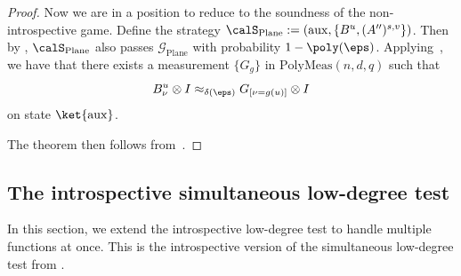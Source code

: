 \documentclass[11pt]{article}
\newcommand{\polymeas}[3]{\mathrm{PolyMeas}(#1,#2,#3)}
\newcommand{\game}{\mathscr{G}}
\begin{document}
\begin{proof}
Now we are in a position to reduce to the soundness of the non-introspective game. Define the strategy $\calS_{\mathrm{Plane}} := (\mathrm{aux}, \{B^u, (A'')^{s, v}\})$.
Then by , $\calS_{\mathrm{Plane}}$ also passes $\game_{\mathrm{Plane}}$ with probability $1-\poly(\eps)$.
Applying~, we have that
there exists a measurement $\{G_g\}$ in $\polymeas{n}{d}{q}$ such that
\begin{equation*}
B^u_{\nu}\otimes I \approx_{\delta(\eps)} G_{[\nu = g(u)]}\otimes I
\end{equation*}
on state $\ket{\mathrm{aux}}$.

The theorem then follows from~.
\end{proof}

\subsection{The introspective simultaneous low-degree test}

In this section, we extend the introspective low-degree test to handle multiple functions at once.
This is the  introspective version of the simultaneous low-degree test from .
\end{document}
